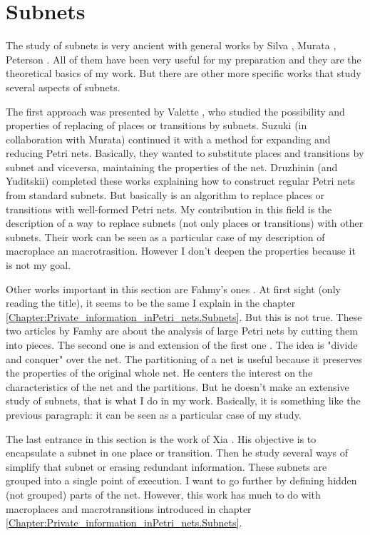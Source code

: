 \section{Subnets}

The study of subnets is very ancient with general works by Silva \cite{G-Silva1985,G-Silva201213},
Murata \cite{G-Murata1977412,G-Murata1989541}, Peterson \cite{G-EPN-Peterson1981}. All of them have been very useful for my preparation and they are the theoretical basics of my work. But there are other more specific works that study several aspects of subnets.

The first approach was presented by Valette \cite{SN-Valette197935}, who
studied the possibility and properties of replacing of places or transitions by subnets.
Suzuki (in collaboration with Murata) \cite{SN-Suzuki198351} continued it
with a method
for expanding and reducing Petri nets. Basically, they wanted to substitute
places and transitions by subnet and viceversa, maintaining the properties
of the net. Druzhinin (and Yuditskii) \cite{SN-DRUZHININVA19921922} completed
these works explaining how to construct regular Petri nets from standard subnets.
But basically is an algorithm to replace places or transitions with well-formed
Petri nets. My contribution in this field is the description of a way to replace subnets (not only places or transitions) with other subnets. Their work can be seen as a particular
case of my description of macroplace an macrotrasition. However I don't deepen the properties because it is not my goal.

Other works important in this section are Fahmy's ones \cite{SN-Fahmy1990321,SN-Fahmy1993127}.
At first sight (only reading the title), it seems to be the same I explain in the chapter \ref{Chapter:Private_information_inPetri_nets.Subnets}. But
this is not true. These two articles by Famhy are about the analysis of large Petri nets by cutting them into pieces. The second one \cite{SN-Fahmy1993127} is and extension of the first one \cite{SN-Fahmy1990321}. The idea is "divide
and conquer" over the net. The partitioning of a net is useful because it preserves the properties of the original whole net. He centers the interest
on the characteristics of the net and the partitions. But he doesn't make an extensive study of subnets, that is what I do in my work. Basically, it is something like the previous paragraph: it can be seen as a particular case of my study. 

The last entrance in this section is the work of Xia \cite{R-Xia20111662}. His objective is to encapsulate a subnet
in one place or transition. Then he study several ways of simplify that subnet
or erasing
redundant information. These subnets are grouped into a single point of execution. I want to go further by defining hidden (not grouped) parts of the net. However, this work  has much to do with macroplaces and macrotransitions  introduced in chapter \ref{Chapter:Private_information_inPetri_nets.Subnets}.

